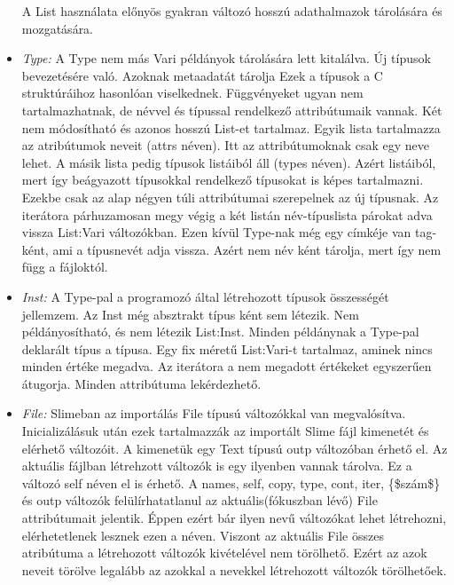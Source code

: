 \begin{itemize}
A List használata előnyös gyakran változó hosszú adathalmazok tárolására és mozgatására.
\item \emph{Type:} 
A Type nem más Vari példányok tárolására lett kitalálva.
Új típusok bevezetésére való.
Azoknak metaadatát tárolja
Ezek a típusok a C struktúráihoz hasonlóan viselkednek.
Függvényeket ugyan nem tartalmazhatnak, de névvel és típussal rendelkező attribútumaik vannak.
Két nem módosítható és azonos hosszú List-et tartalmaz.
Egyik lista tartalmazza az atribútumok neveit (attrs néven).
Itt az attribútumoknak csak egy neve lehet.
A másik lista pedig típusok listáiból áll (types néven).
Azért listáiból, mert így beágyazott típusokkal rendelkező típusokat is képes tartalmazni.
Ezekbe csak az alap négyen túli attribútumai szerepelnek az új típusnak.
Az iterátora párhuzamosan megy végig a két listán név-típuslista párokat adva vissza List:Vari változókban.
Ezen kívül Type-nak még egy címkéje van tag-ként, ami a típusnevét adja vissza.
Azért nem név ként tárolja, mert így nem függ a fájloktól.
\item \emph{Inst:} 
A Type-pal a programozó által létrehozott típusok összességét jellemzem.
Az Inst még absztrakt típus ként sem létezik.
Nem példányosítható, és nem létezik List:Inst.
Minden példánynak a Type-pal deklarált típus a típusa.
Egy fix méretű List:Vari-t tartalmaz, aminek nincs minden értéke megadva.
Az iterátora a nem megadott értékeket egyszerűen átugorja.
Minden attribútuma lekérdezhető.
\item \emph{File:} 
Slimeban az importálás File típusú változókkal van megvalósítva.
Inicializálásuk után ezek tartalmazzák az importált Slime fájl kimenetét és elérhető változóit.
A kimenetük egy Text típusú outp változóban érhető el.
Az aktuális fájlban létrehzott változók is egy ilyenben vannak tárolva.
Ez a változó self néven el is érhető.
A names, self, copy, type, cont, iter, \{\$szám\$\} és outp változók felülírhatatlanul az aktuális(fókuszban lévő) File attribútumait jelentik.
Éppen ezért bár ilyen nevű változókat lehet létrehozni, elérhetetlenek lesznek ezen a néven.
Viszont az aktuális File összes atribútuma a létrehozott változók kivételével nem törölhető.
Ezért az azok neveit törölve legalább az azokkal a nevekkel létrehozott változók törölhetőek.
\end{itemize}


